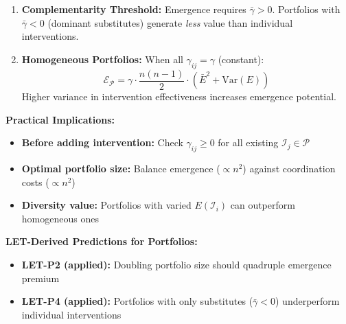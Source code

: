 \begin{tcolorbox}[colback=orange!5!white, colframe=orange!75!black,
    title=Integration: HHH $\leftrightarrow$ FORMAL-LET (IV)]
\begin{enumerate}[nosep]
\item \textbf{Complementarity Threshold:} Emergence requires $\bar{\gamma} > 0$. Portfolios with $\bar{\gamma} < 0$ (dominant substitutes) generate \textit{less} value than individual interventions.

\item \textbf{Homogeneous Portfolios:} When all $\gamma_{ij} = \gamma$ (constant):
\begin{equation}
\mathcal{E}_{\mathcal{P}} = \gamma \cdot \frac{n(n-1)}{2} \cdot (\bar{E}^2 + \text{Var}(E))
\end{equation}
Higher variance in intervention effectiveness increases emergence potential.
\end{enumerate}

\textbf{Practical Implications:}

\begin{itemize}[nosep]
\item \textbf{Before adding intervention:} Check $\gamma_{ij} \geq 0$ for all existing $\mathcal{I}_j \in \mathcal{P}$
\item \textbf{Optimal portfolio size:} Balance emergence ($\propto n^2$) against coordination costs ($\propto n^2$)
\item \textbf{Diversity value:} Portfolios with varied $E(\mathcal{I}_i)$ can outperform homogeneous ones
\end{itemize}

\textbf{LET-Derived Predictions for Portfolios:}

\begin{itemize}[nosep]
\item \textbf{LET-P2 (applied):} Doubling portfolio size should quadruple emergence premium
\item \textbf{LET-P4 (applied):} Portfolios with only substitutes ($\bar{\gamma} < 0$) underperform individual interventions
\end{itemize}

\end{tcolorbox}

